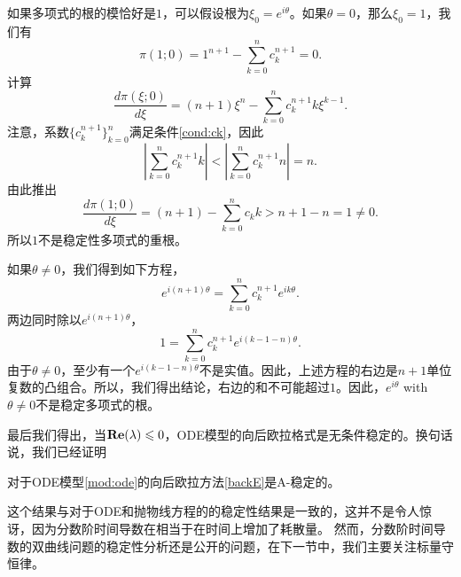 如果多项式的根的模恰好是$1$，可以假设根为$\xi_0=e^{i\theta}$。如果$\theta=0$，那么$\xi_0=1$，我们有 
\[
\pi(1;0)= 1^{n+1} - \sum_{k=0}^{n} c^{n+1}_k=0.
\]
计算
\[
\frac{d \pi (\xi;0)}{d \xi} =(n+1)\xi^n - \sum_{k=0}^{n} c^{n+1}_k k \xi^{k-1}.
\]
注意，系数$\{ c^{n+1}_k\}^n_{k=0}$满足条件\eqref{cond:ck}，因此
\[
\left| \sum_{k=0}^{n} c^{n+1}_k k \right|<\left| \sum_{k=0}^{n} c^{n+1}_k n\right|=n.
\]
由此推出
\[
\frac{d \pi (1;0)}{d \xi}=(n+1) - \sum_{k=0}^{n} c_k k >n+1-n=1 \ne 0.
\]
所以$1$不是稳定性多项式的重根。

如果$\theta\ne 0$，我们得到如下方程，
\[
e^{i(n+1)\theta}=\sum_{k=0}^{n} c^{n+1}_k e^{ik\theta}.
 \]
两边同时除以$e^{i(n+1)\theta}$，
 \[
 1=\sum_{k=0}^{n} c^{n+1}_k e^{i(k-1-n)\theta}.
  \] 
由于$\theta\ne 0$，至少有一个$e^{i(k-1-n)\theta}$不是实值。因此，上述方程的右边是$n + 1$单位复数的凸组合。所以，我们得出结论，右边的和不可能超过$1$。因此，$e^{i\theta}$ with $\theta \ne 0$不是稳定多项式的根。


最后我们得出，当${\bf Re} (\lambda) \le 0$，ODE模型的向后欧拉格式是无条件稳定的。换句话说，我们已经证明
\begin{thm}
对于ODE模型\eqref{mod:ode}的向后欧拉方法\eqref{backE}是A-稳定的。
\end{thm}
这个结果与对于ODE和抛物线方程的的稳定性结果是一致的，这并不是令人惊讶，因为分数阶时间导数在相当于在时间上增加了耗散量。 然而，分数阶时间导数的双曲线问题的稳定性分析还是公开的问题，在下一节中，我们主要关注标量守恒律。

